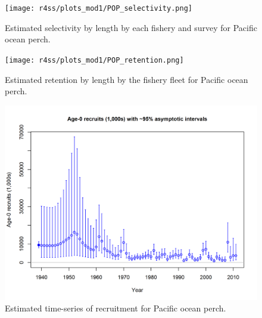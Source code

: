 \documentclass[12pt,]{article}
\begin{document}
\FloatBarrier 

\begin{figure}
\centering
\texttt{[image: r4ss/plots\_mod1/POP\_selectivity.png]}
\caption{Estimated selectivity by length by each fishery and survey for
Pacific ocean perch. \label{fig:selex}}
\end{figure}

\FloatBarrier 

\begin{figure}
\centering
\texttt{[image: r4ss/plots\_mod1/POP\_retention.png]}
\caption{Estimated retention by length by the fishery fleet for Pacific
ocean perch. \label{fig:retention}}
\end{figure}

\FloatBarrier 

\begin{figure}
\centering
\includegraphics{r4ss/plots_mod1/ts11_Age-0_recruits_(1000s)_with_95_asymptotic_intervals.png}
\caption{Estimated time-series of recruitment for Pacific ocean perch.
\label{fig:recruits}}
\end{figure}

\FloatBarrier
\end{document}
